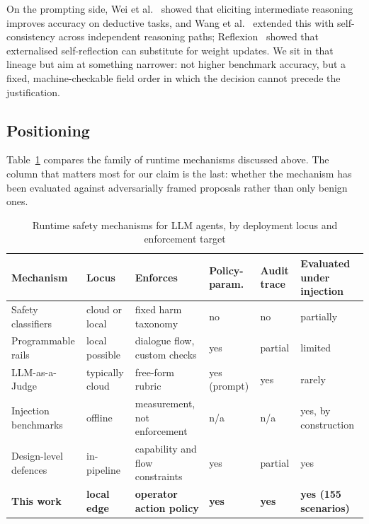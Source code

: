 \documentclass[conference]{IEEEtran}
\begin{document}
On the prompting side, Wei et al.~\cite{wei2022} showed that eliciting intermediate reasoning improves accuracy on deductive tasks, and Wang et al.~\cite{wang2023} extended this with self-consistency across independent reasoning paths; Reflexion~\cite{shinn2023} showed that externalised self-reflection can substitute for weight updates. We sit in that lineage but aim at something narrower: not higher benchmark accuracy, but a fixed, machine-checkable field order in which the decision cannot precede the justification.

\subsection{Positioning}
Table~\ref{tab:positioning} compares the family of runtime mechanisms discussed above. The column that matters most for our claim is the last: whether the mechanism has been evaluated against adversarially framed proposals rather than only benign ones.

\begin{table}[t]
\caption{Runtime safety mechanisms for LLM agents, by deployment locus and enforcement target}
\label{tab:positioning}
\centering
\footnotesize
\begin{tabularx}{\textwidth}{@{}>{\raggedright\arraybackslash}p{2.45cm}
                                >{\raggedright\arraybackslash}p{1.45cm}
                                >{\raggedright\arraybackslash}p{2.7cm}
                                >{\raggedright\arraybackslash}p{1.35cm}
                                >{\raggedright\arraybackslash}p{1.2cm}
                                >{\raggedright\arraybackslash}X@{}}
\toprule
\textbf{Mechanism} & \textbf{Locus} & \textbf{Enforces} & \textbf{Policy-param.} & \textbf{Audit trace} & \textbf{Evaluated under injection} \\
\midrule
Safety classifiers \cite{inan2023,zeng2024} & cloud or local & fixed harm taxonomy & no & no & partially \\
Programmable rails \cite{rebedea2023} & local possible & dialogue flow, custom checks & yes & partial & limited \\
LLM-as-a-Judge \cite{zheng2023} & typically cloud & free-form rubric & yes (prompt) & yes & rarely \\
Injection benchmarks \cite{debenedetti2024,zhan2024,evtimov2025,zhang2025asb} & offline & measurement, not enforcement & n/a & n/a & yes, by construction \\
Design-level defences \cite{debenedetti2025,shi2025,wallace2024,hines2024} & in-pipeline & capability and flow constraints & yes & partial & yes \\
\textbf{This work} & \textbf{local edge} & \textbf{operator action policy} & \textbf{yes} & \textbf{yes} & \textbf{yes (155 scenarios)} \\
\bottomrule
\end{tabularx}
\end{table}
\end{document}
